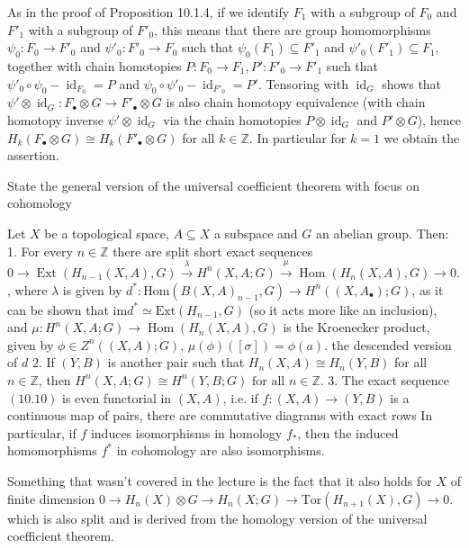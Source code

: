 As in the proof of Proposition 10.1.4, if we identify \( F_1 \) with a subgroup of \( F_0 \) and \( F'_1 \) with a subgroup of \( F'_0 \), 
this means that there are group homomorphisms \(\psi_0 : F_0 \rightarrow F'_0 \) and \(\psi'_0: F'_0 \rightarrow F_0 \) such that 
\(\psi_0 (F_1) \subseteq F'_1 \) and \(\psi'_0 (F'_1) \subseteq F_1\), together with chain homotopies 
\( P : F_0 \rightarrow F_1, P' : F'_0 \rightarrow F'_1 \) 
such that \(\psi'_0 \circ \psi_0 - \operatorname{id}_{F_0} = P\) and \(\psi_0 \circ \psi'_0 - \operatorname{id}_{F'_0} = P'\). 
Tensoring with \(\operatorname{id}_G\) shows that 
\(\psi' \otimes \operatorname{id}_G : F_{\bullet} \otimes G \rightarrow F'_{\bullet} \otimes G \) 
is also chain homotopy equivalence 
(with chain homotopy inverse \(\psi' \otimes \operatorname{id}_G\) via the chain homotopies \( P \otimes \operatorname{id}_G\) and 
\( P' \otimes G\)), hence \( H_k (F_{\bullet} \otimes G) \cong H_k (F'_{\bullet} \otimes G)\) for all \( k \in \mathbb{Z}\). 
In particular for \( k = 1\) we obtain the assertion.


State the general version of the universal coefficient theorem with focus on cohomology

Let \(X\) be a topological space, \(A \subseteq X\) a subspace and \(G\) an abelian group. Then:
1. For every \(n \in \mathbb{Z}\) there are split short exact sequences
\(0 \longrightarrow \operatorname{Ext}(H_{n-1}(X, A), G) \xrightarrow{\lambda} H^n(X, A; G) \xrightarrow{\mu} \operatorname{Hom}(H_n(X, A), G) \longrightarrow 0.\),
where \( \lambda \) is given by \( d^\ast : \text{Hom}(B(X, A)_{n-1}, G) \to H^n((X, A_\bullet);G) \), as it can be shown that \( \text{im} d^\ast \simeq \text{Ext}(H_{n-1}, G)\) (so it acts more like an inclusion), and \( \mu : H^n(X, A; G) \to \operatorname{Hom}(H_n(X, A), G) \) is the Kroenecker product, given by \( \phi \in Z^n((X, A);G) \), \( \mu(\phi)([\sigma]) = \phi(a) \).
the descended version of \( d \)
2. If \((Y, B)\) is another pair such that \(H_n(X, A) \cong H_n(Y, B)\) for all \(n \in \mathbb{Z}\), then 
\(
H^n(X, A; G) \cong H^n(Y, B; G) \text{ for all } n \in \mathbb{Z}.
\)
3. The exact sequence \((10.10)\) is even functorial in \((X, A)\), i.e. if \(f : (X, A) \rightarrow (Y, B)\) is a continuous map of pairs, there are commutative diagrams with exact rows
In particular, if \(f\) induces isomorphisms in homology \(f_*\), then the induced homomorphisms \(f^*\) in cohomology are also isomorphisms.

Something that wasn't covered in the lecture is the fact that it also holds for \( X \) of finite dimension
\(0 \longrightarrow H_n(X) \otimes G \longrightarrow H_n(X;G) \longrightarrow \text{Tor}(H_{n+1}(X), G) \to 0.\)
which is also split and is derived from the homology version of the universal coefficient theorem.



